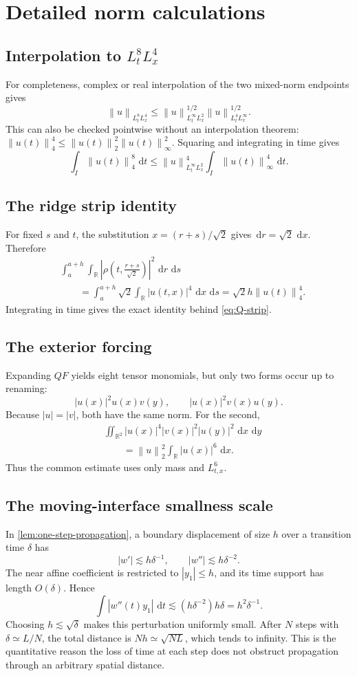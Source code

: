 \documentclass[11pt,oneside]{book}
\theoremstyle{definition}
\theoremstyle{remark}
\newcommand{\R}{\mathbb R}
\newcommand{\1}{\mathbf 1}
\newcommand{\dd}{\,\mathrm d}
\newcommand{\norm}[1]{\left\lVert #1\right\rVert}
\begin{document}
\chapter{Detailed norm calculations}\label{app:norms}

\section{Interpolation to \texorpdfstring{$L^8_tL^4_x$}{L8t L4x}}
For completeness, complex or real interpolation of the two mixed-norm
endpoints gives
\[
 \norm u_{L^8_tL^4_x}
 \le\norm u_{L^\infty_tL^2_x}^{1/2}
      \norm u_{L^4_tL^\infty_x}^{1/2}.
\]
This can also be checked pointwise without an interpolation theorem:
$\norm{u(t)}_4^4\le\norm{u(t)}_2^2\norm{u(t)}_\infty^2$.  Squaring and
integrating in time gives
\[
 \int_I\norm{u(t)}_4^8\,\dd t
 \le\norm u_{L^\infty_tL^2_x}^4
      \int_I\norm{u(t)}_\infty^4\,\dd t.
\]

\section{The ridge strip identity}
For fixed $s$ and $t$, the substitution
$x=(r+s)/\sqrt2$ gives $\dd r=\sqrt2\,\dd x$.  Therefore
\begin{align*}
 &\int_a^{a+h}\int_\R
 \left|\rho\!\left(t,\frac{r+s}{\sqrt2}\right)\right|^2
 \,\dd r\,\dd s\\
 &\qquad=\int_a^{a+h}\sqrt2\int_\R|u(t,x)|^4\,\dd x\,\dd s
 =\sqrt2h\norm{u(t)}_4^4.
\end{align*}
Integrating in time gives the exact identity behind \eqref{eq:Q-strip}.

\section{The exterior forcing}
Expanding $QF$ yields eight tensor monomials, but only two forms occur up to
renaming:
\[
 |u(x)|^2u(x)v(y),
 \qquad
 |u(x)|^2v(x)u(y).
\]
Because $|u|=|v|$, both have the same norm.  For the second,
\begin{align*}
 &\iint_{\R^2}|u(x)|^4|v(x)|^2|u(y)|^2\,\dd x\,\dd y\\
 &\qquad=\norm u_2^2\int_\R|u(x)|^6\,\dd x.
\end{align*}
Thus the common estimate uses only mass and $L^6_{t,x}$.

\section{The moving-interface smallness scale}
In \cref{lem:one-step-propagation}, a boundary displacement of size $h$ over
a transition time $\delta$ has
\[
 |w'|\lesssim h\delta^{-1},
 \qquad |w''|\lesssim h\delta^{-2}.
\]
The near affine coefficient is restricted to $|y_1|\le h$, and its time
support has length $O(\delta)$.  Hence
\[
 \int |w''(t)y_1|\,\dd t
 \lesssim (h\delta^{-2})h\delta
 =h^2\delta^{-1}.
\]
Choosing $h\lesssim\sqrt\delta$ makes this perturbation uniformly small.
After $N$ steps with $\delta\simeq L/N$, the total distance is
$Nh\simeq\sqrt{NL}$, which tends to infinity.  This is the quantitative
reason the loss of time at each step does not obstruct propagation through an
arbitrary spatial distance.
\end{document}
